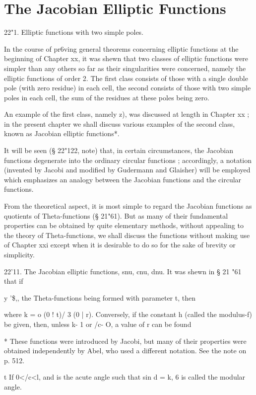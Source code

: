 \chapter{The Jacobian Elliptic Functions} 

22"1. Elliptic functions with two simple poles. 

In the course of pr6ving general theorems concerning elliptic functions 
at the beginning of Chapter xx, it was shewn that two classes of elliptic 
functions were simpler than any others so far as their singularities were 
concerned, namely the elliptic functions of order 2. The first class consists 
of those with a single double pole (with zero residue) in each cell, the second 
consists of those with two simple poles in each cell, the sum of the residues 
at these poles being zero. 

An example of the first class, namely    z), was discussed at length in 
Chapter xx ; in the present chapter we shall discuss various examples of 
the second class, known as Jacobian elliptic functions*. 

It will be seen (§ 22"122, note) that, in certain circumstances, the Jacobian 
functions degenerate into the ordinary circular functions ; accordingly, a 
notation (invented by Jacobi and modified by Gudermann and Glaisher) will 
be employed which emphasizes an analogy between the Jacobian functions 
and the circular functions. 

From the theoretical aspect, it is most simple to regard the Jacobian 
functions as quotients of Theta-functions (§ 21"61). But as many of their 
fundamental properties can be obtained by quite elementary methods, 
without appealing to the theory of Theta-functions, we shall discuss the 
functions without making use of Chapter xxi except when it is desirable to 
do so for the sake of brevity or simplicity. 

22'11. The Jacobian elliptic functions, snu, cnu, dnu. 
It was shewn in § 21 "61 that if 

y '\$,,%
the Theta-functions being formed with parameter t, then 

where k  =  o (0 ! t)/ 3 (0 | r). Conversely, if the constant h (called the 
modulus-f) be given, then, unless k- 1 or /c- O, a value of r can be found 

* These functions were introduced by Jacobi, but many of their properties were obtained 
independently by Abel, who used a different notation. See the note on p. 512. 

t If 0</c<l, and is the acute angle such that sin d = k, 6 is called the modular angle. 




